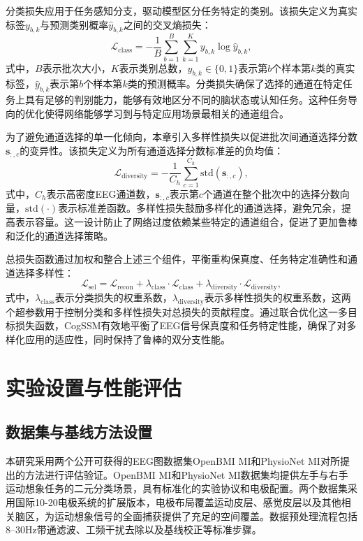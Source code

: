分类损失应用于任务感知分支，驱动模型区分任务特定的类别。该损失定义为真实标签$y_{b,k}$与预测类别概率$\hat{y}_{b,k}$之间的交叉熵损失：
\begin{equation}
\mathcal{L}_{\text{class}} = -\frac{1}{B} \sum_{b=1}^{B} \sum_{k=1}^{K} y_{b,k} \log \hat{y}_{b,k},
\end{equation}
式中，$B$表示批次大小，$K$表示类别总数，$y_{b,k} \in \{0,1\}$表示第$b$个样本第$k$类的真实标签，$\hat{y}_{b,k}$表示第$b$个样本第$k$类的预测概率。分类损失确保了选择的通道在特定任务上具有足够的判别能力，能够有效地区分不同的脑状态或认知任务。这种任务导向的优化使得网络能够学习到与特定应用场景最相关的通道组合。

为了避免通道选择的单一化倾向，本章引入多样性损失以促进批次间通道选择分数$\mathbf{s}_{:,c}$的变异性。该损失定义为所有通道选择分数标准差的负均值：
\begin{equation}
\mathcal{L}_{\text{diversity}} = -\frac{1}{C_h} \sum_{c=1}^{C_h} \text{std}(\mathbf{s}_{:,c}),
\end{equation}
式中，$C_h$表示高密度EEG通道数，$\mathbf{s}_{:,c}$表示第$c$个通道在整个批次中的选择分数向量，$\text{std}(\cdot)$表示标准差函数。多样性损失鼓励多样化的通道选择，避免冗余，提高表示容量。这一设计防止了网络过度依赖某些特定的通道组合，促进了更加鲁棒和泛化的通道选择策略。


总损失函数通过加权和整合上述三个组件，平衡重构保真度、任务特定准确性和通道选择多样性：
\begin{equation}
\mathcal{L}_{\text{sel}} = \mathcal{L}_{\text{recon}} + \lambda_{\text{class}} \cdot \mathcal{L}_{\text{class}} + \lambda_{\text{diversity}} \cdot \mathcal{L}_{\text{diversity}},
\end{equation}
式中，$\lambda_{\text{class}}$表示分类损失的权重系数，$\lambda_{\text{diversity}}$表示多样性损失的权重系数，这两个超参数用于控制分类和多样性损失对总损失的贡献程度。通过联合优化这一多目标损失函数，CogSSM有效地平衡了EEG信号保真度和任务特定性能，确保了对多样化应用的适应性，同时保持了鲁棒的双分支性能。

\section{实验设置与性能评估}
\subsection{数据集与基线方法设置}
本研究采用两个公开可获得的EEG图数据集OpenBMI MI\cite{lee2019eeg}和PhysioNet MI\cite{schalk2002general}对所提出的方法进行评估验证。OpenBMI MI和PhysioNet MI数据集均提供左手与右手运动想象任务的二元分类场景，具有标准化的实验协议和电极配置。两个数据集采用国际10-20电极系统的扩展版本，电极布局覆盖运动皮层、感觉皮层以及其他相关脑区，为运动想象信号的全面捕获提供了充足的空间覆盖。数据预处理流程包括8--30Hz带通滤波、工频干扰去除以及基线校正等标准步骤。

